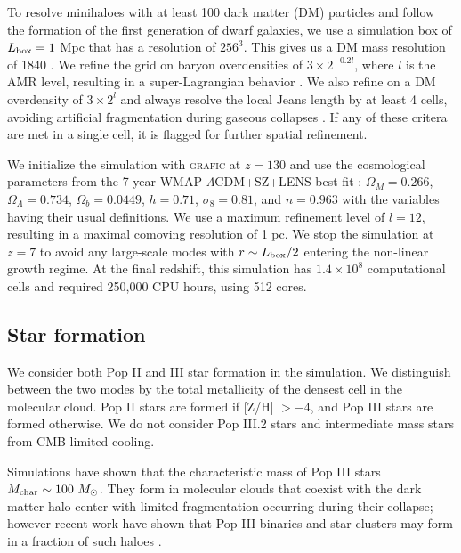 \documentclass[useAMS,usenatbib]{mn2e}
\begin{document}
To resolve minihaloes with at least 100 dark matter (DM) particles and
follow the formation of the first generation of dwarf galaxies, we use
a simulation box of $L_{\rm box} = 1$ Mpc that has a resolution of
$256^3$.  This gives us a DM mass resolution of 1840 \Ms.  We refine
the grid on baryon overdensities of $3 \times 2^{-0.2l}$, where $l$ is
the AMR level, resulting in a super-Lagrangian behavior \citep[also
see][]{OShea08}.  We also refine on a DM overdensity of $3 \times 2^l$
and always resolve the local Jeans length by at least 4 cells,
avoiding artificial fragmentation during gaseous collapses
\citep{Truelove97}.  If any of these critera are met in a single cell,
it is flagged for further spatial refinement.

We initialize the simulation with \textsc{grafic}
\citep{Bertschinger01} at $z = 130$ and use the cosmological
parameters from the 7-year WMAP $\Lambda$CDM+SZ+LENS best fit
\citep{WMAP7}: $\Omega_M = 0.266$, $\Omega_\Lambda = 0.734$, $\Omega_b
= 0.0449$, $h = 0.71$, $\sigma_8 = 0.81$, and $n = 0.963$ with the
variables having their usual definitions.  We use a maximum refinement
level of $l = 12$, resulting in a maximal comoving resolution of 1 pc.
We stop the simulation at $z=7$ to avoid any large-scale modes with $r
\sim L_{\rm box}/2$ entering the non-linear growth regime.  At the
final redshift, this simulation has $1.4 \times 10^8$ computational
cells and required 250,000 CPU hours, using 512 cores.

\subsection{Star formation}

We consider both Pop II and III star formation in the simulation.  We
distinguish between the two modes by the total metallicity of the
densest cell in the molecular cloud.  Pop II stars are formed if [Z/H]
$> -4$, and Pop III stars are formed otherwise.  We do not consider
Pop III.2 stars and intermediate mass stars from CMB-limited cooling.

Simulations have shown that the characteristic mass of Pop III stars
$M_{\rm char} \sim 100~\Ms$.  They form in molecular clouds that
coexist with the dark matter halo center with limited fragmentation
occurring during their collapse; however recent work have shown that
Pop III binaries and star clusters may form in a fraction of such
haloes \citep{2009Sci...325..601T, Stacy10_Binary, Greif11_P3Cluster}.
\end{document}
